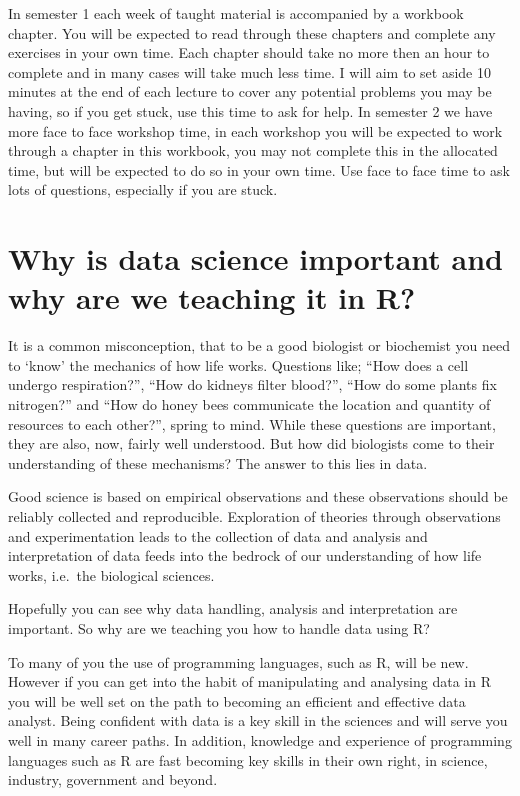 \documentclass[
]{book}
\begin{document}
In semester 1 each week of taught material is accompanied by a workbook chapter. You will be expected to read through these chapters and complete any exercises in your own time. Each chapter should take no more then an hour to complete and in many cases will take much less time. I will aim to set aside 10 minutes at the end of each lecture to cover any potential problems you may be having, so if you get stuck, use this time to ask for help. In semester 2 we have more face to face workshop time, in each workshop you will be expected to work through a chapter in this workbook, you may not complete this in the allocated time, but will be expected to do so in your own time. Use face to face time to ask lots of questions, especially if you are stuck.

\hypertarget{why-is-data-science-important-and-why-are-we-teaching-it-in-r}{%
\section{Why is data science important and why are we teaching it in R?}\label{why-is-data-science-important-and-why-are-we-teaching-it-in-r}}

It is a common misconception, that to be a good biologist or biochemist you need to `know' the mechanics of how life works. Questions like; ``How does a cell undergo respiration?'', ``How do kidneys filter blood?'', ``How do some plants fix nitrogen?'' and ``How do honey bees communicate the location and quantity of resources to each other?'', spring to mind. While these questions are important, they are also, now, fairly well understood. But how did biologists come to their understanding of these mechanisms? The answer to this lies in data.

Good science is based on empirical observations and these observations should be reliably collected and reproducible. Exploration of theories through observations and experimentation leads to the collection of data and analysis and interpretation of data feeds into the bedrock of our understanding of how life works, i.e.~the biological sciences.

Hopefully you can see why data handling, analysis and interpretation are important. So why are we teaching you how to handle data using R?

To many of you the use of programming languages, such as R, will be new. However if you can get into the habit of manipulating and analysing data in R you will be well set on the path to becoming an efficient and effective data analyst. Being confident with data is a key skill in the sciences and will serve you well in many career paths. In addition, knowledge and experience of programming languages such as R are fast becoming key skills in their own right, in science, industry, government and beyond.
\end{document}
